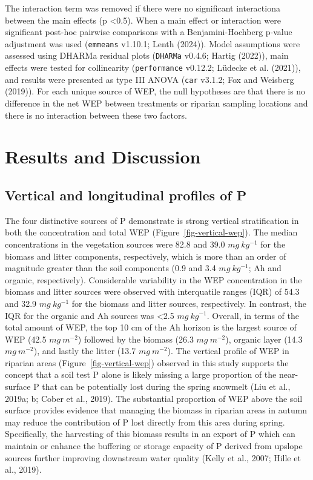 \documentclass[
]{agujournal2019}
\begin{document}
The interaction term was removed if there were no significant
interactiona between the main effects (p \textless0.5). When a main
effect or interaction were significant post-hoc pairwise comparisons
with a Benjamini-Hochberg p-value adjustment was used (\texttt{emmeans}
v1.10.1; Lenth (2024)). Model assumptions were assessed using DHARMa
residual plots (\texttt{DHARMa} v0.4.6; Hartig (2022)), main effects
were tested for collinearity (\texttt{performance} v0.12.2; Lüdecke et
al. (2021)), and results were presented as type III ANOVA (\texttt{car}
v3.1.2; Fox and Weisberg (2019)). For each unique source of WEP, the
null hypotheses are that there is no difference in the net WEP between
treatments or riparian sampling locations and there is no interaction
between these two factors.

\section{Results and Discussion}\label{results-and-discussion}

\subsection{Vertical and longitudinal profiles of
P}\label{vertical-and-longitudinal-profiles-of-p}

The four distinctive sources of P demonstrate is strong vertical
stratification in both the concentration and total WEP
(Figure~\ref{fig-vertical-wep}). The median concentrations in the
vegetation sources were 82.8 and 39.0 \(mg~kg^{-1}\) for the biomass and
litter components, respectively, which is more than an order of
magnitude greater than the soil components (0.9 and 3.4 \(mg~kg^{-1}\);
Ah and organic, respectively). Considerable variability in the WEP
concentration in the biomass and litter sources were observed with
interquatile ranges (IQR) of 54.3 and 32.9 \(mg~kg^{-1}\) for the
biomass and litter sources, respectively. In contrast, the IQR for the
organic and Ah sources was \textless2.5 \(mg~kg^{-1}\). Overall, in
terms of the total amount of WEP, the top 10 cm of the Ah horizon is the
largest source of WEP (42.5 \(mg~m^{-2}\)) followed by the biomass (26.3
\(mg~m^{-2}\)), organic layer (14.3 \(mg~m^{-2}\)), and lastly the
litter (13.7 \(mg~m^{-2}\)). The vertical profile of WEP in riparian
areas (Figure~\ref{fig-vertical-wep}) observed in this study supports
the concept that a soil test P alone is likely missing a large
proportion of the near-surface P that can be potentially lost during the
spring snowmelt (Liu et al., 2019a; b; Cober et al., 2019). The
substantial proportion of WEP above the soil surface provides evidence
that managing the biomass in riparian areas in autumn may reduce the
contribution of P lost directly from this area during spring.
Specifically, the harvesting of this biomass results in an export of P
which can maintain or enhance the buffering or storage capacity of P
derived from upslope sources further improving downstream water quality
(Kelly et al., 2007; Hille et al., 2019).
\end{document}
